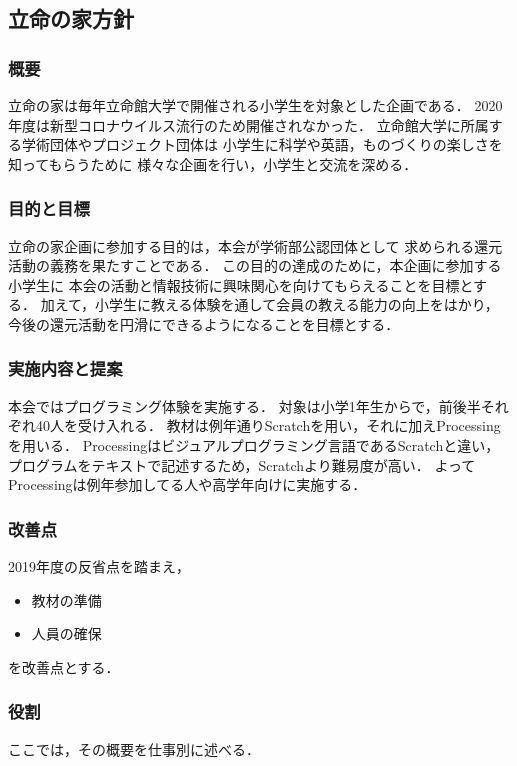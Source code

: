 \subsection*{立命の家方針}

\subsubsection*{概要}
立命の家は毎年立命館大学で開催される小学生を対象とした企画である．
2020年度は新型コロナウイルス流行のため開催されなかった．
立命館大学に所属する学術団体やプロジェクト団体は
小学生に科学や英語，ものづくりの楽しさを知ってもらうために
様々な企画を行い，小学生と交流を深める．

\subsubsection*{目的と目標}
立命の家企画に参加する目的は，本会が学術部公認団体として
求められる還元活動の義務を果たすことである．
この目的の達成のために，本企画に参加する小学生に
本会の活動と情報技術に興味関心を向けてもらえることを目標とする．
加えて，小学生に教える体験を通して会員の教える能力の向上をはかり，
今後の還元活動を円滑にできるようになることを目標とする．

\subsubsection*{実施内容と提案}
本会ではプログラミング体験を実施する．
対象は小学1年生からで，前後半それぞれ40人を受け入れる．
教材は例年通りScratchを用い，それに加えProcessingを用いる．
Processingはビジュアルプログラミング言語であるScratchと違い，
プログラムをテキストで記述するため，Scratchより難易度が高い．
よってProcessingは例年参加してる人や高学年向けに実施する．

\subsubsection*{改善点}
2019年度の反省点を踏まえ，
\begin{itemize}
  \item 教材の準備
  \item 人員の確保
\end{itemize}
を改善点とする．

\subsubsection*{役割}
ここでは，その概要を仕事別に述べる．

